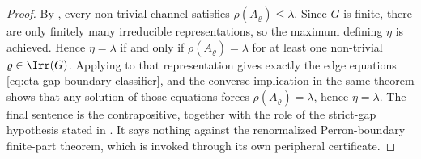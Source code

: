 \begin{proof}
  By , every non-trivial channel
  satisfies \(\rho(A_\varrho)\le\lambda\). Since \(G\) is finite, there
  are only finitely many irreducible representations, so the maximum
  defining \(\eta\) is achieved. Hence \(\eta=\lambda\) if and only if
  \(\rho(A_\varrho)=\lambda\) for at least one non-trivial
  \(\varrho\in\Irr(G)\). Applying  to that
  representation gives exactly the edge equations
  \eqref{eq:eta-gap-boundary-classifier}, and the converse implication in
  the same theorem shows that any solution of those equations forces
  \(\rho(A_\varrho)=\lambda\), hence \(\eta=\lambda\). The final sentence
  is the contrapositive, together with the role of the strict-gap
  hypothesis stated in .  It says
  nothing against the renormalized Perron-boundary finite-part theorem,
  which is invoked through its own peripheral certificate.
\end{proof}


